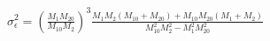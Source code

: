 


\begin{eqnarray*}
\sigma_\epsilon^2 = \left(\frac{M_1 M_{20}}{M_{10} M_2}\right)^3 \frac{M_1 M_2 ( M_{10} + M_{20}) + M_{10} M_{20} (M_1 + M_2)}{M_{10}^2 M_2^2 - M_1^2 M_{20}^2}
\end{eqnarray*}

